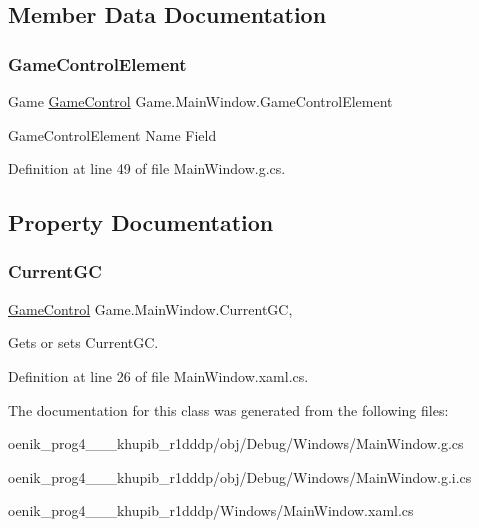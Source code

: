 \subsection{Member Data Documentation}
\mbox{\label{class_game_1_1_main_window_ab3d2bf59d20ea9c2dd123d23229b1c7b}} 
\subsubsection{\texorpdfstring{GameControlElement}{GameControlElement}}
{\footnotesize\ttfamily Game \mbox{\hyperlink{class_game_1_1_game_control}{Game\+Control}} Game.\+Main\+Window.\+Game\+Control\+Element}



Game\+Control\+Element Name Field 



Definition at line 49 of file Main\+Window.\+g.\+cs.



\subsection{Property Documentation}
\mbox{\label{class_game_1_1_main_window_a16813a457581b1f200ab2eeb6d74e0a1}} 
\subsubsection{\texorpdfstring{CurrentGC}{CurrentGC}}
{\footnotesize\ttfamily \mbox{\hyperlink{class_game_1_1_game_control}{Game\+Control}} Game.\+Main\+Window.\+Current\+GC\hspace{0.3cm}{\ttfamily [get]}, {\ttfamily [set]}}



Gets or sets Current\+GC. 



Definition at line 26 of file Main\+Window.\+xaml.\+cs.



The documentation for this class was generated from the following files\+:\begin{DoxyCompactItemize}
\item 
oenik\+\_\+prog4\+\_\+\_\+\_\+khupib\+\_\+r1dddp/obj/\+Debug/\+Windows/Main\+Window.\+g.\+cs\item 
oenik\+\_\+prog4\+\_\+\_\+\_\+khupib\+\_\+r1dddp/obj/\+Debug/\+Windows/Main\+Window.\+g.\+i.\+cs\item 
oenik\+\_\+prog4\+\_\+\_\+\_\+khupib\+\_\+r1dddp/\+Windows/Main\+Window.\+xaml.\+cs\end{DoxyCompactItemize}
